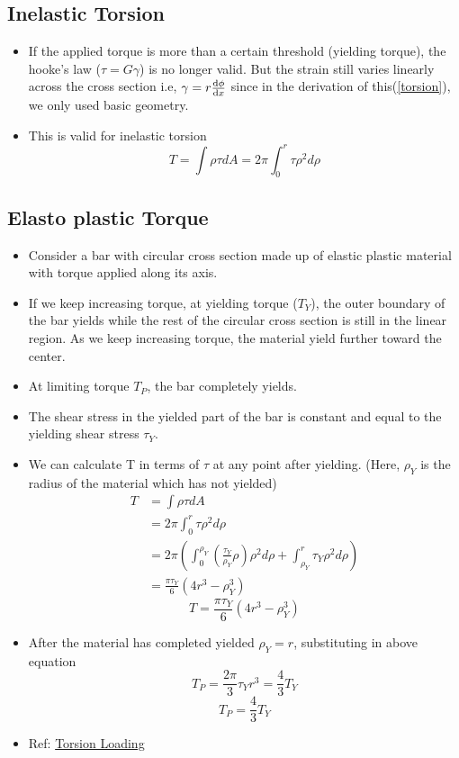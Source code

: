 \documentclass{article}
\begin{document}
	\subsection{Inelastic Torsion}
	\begin{itemize}
		\item If the applied torque is more than a certain threshold (yielding torque), the hooke's law ($\tau = G \gamma$) is no longer valid. But the strain still varies linearly across the cross section i.e, $\gamma = r\dv{\phi}{x}$ since in the derivation of this(\ref{torsion}), we only used basic geometry.

		\item This is valid for inelastic torsion
		\[T = \int \rho \tau dA = 2 \pi \int_0^r \tau \rho^2 d\rho\]


	\end{itemize}

	\subsection{Elasto plastic Torque}
	\begin{itemize}
		\item Consider a bar with circular cross section made up of elastic plastic material with torque applied along its axis.

		\item If we keep increasing torque, at yielding torque ($T_Y$), the outer boundary of the bar yields while the rest of the circular cross section is still in the linear region. As we keep increasing torque, the material yield further toward the center.

		\item At limiting torque $T_P$, the bar completely yields.

		\item The shear stress in the yielded part of the bar is constant and equal to the yielding shear stress $\tau_Y$.

		\item We can calculate T in terms of $\tau$ at any point after yielding. (Here, $\rho_Y$ is the radius of the material which has not yielded)
		\begin{align*}
			T &= \int \rho \tau dA\\
			  &= 2\pi \int_0^r \tau \rho^2 d\rho\\
			  &= 2\pi \left(\int_0^{\rho_Y} (\frac{\tau_Y}{\rho_Y} \rho) \rho^2 d\rho + \int_{\rho_Y}^r \tau_Y \rho^2 d\rho \right)\\
			  &= \frac{\pi \tau_Y}{6} (4r^3 - \rho^3_Y)
		\end{align*}
		\[\boxed{T=\frac{\pi \tau_Y}{6} (4r^3 - \rho^3_Y)}\]

		\item After the material has completed yielded $\rho_Y = r$, substituting in above equation
			\[T_P = \frac{2\pi}{3}\tau_Y r^3 = \frac{4}{3}T_Y\]
			\[\boxed{T_P = \frac{4}{3} T_Y}\]

		\item Ref: \href{https://classes.mst.edu/civeng2211/lessons/torsion/theory_full/index.html}{Torsion Loading}

	\end{itemize}
\end{document}
